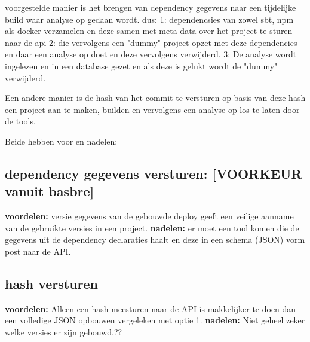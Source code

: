 voorgestelde manier is het brengen van dependency gegevens naar een tijdelijke build waar analyse op gedaan wordt. dus: 1: dependencsies van zowel sbt, npm als docker verzamelen en deze samen met meta data over het project te sturen naar de api  2: die vervolgens een "dummy" project opzet met deze dependencies en daar een analyse op doet en deze vervolgens verwijderd. 3: De analyse wordt ingelezen en in een database gezet en als deze is gelukt wordt de "dummy" verwijderd.

Een andere manier is de hash van het commit te versturen op basis van deze hash een project aan te maken, builden en vervolgens een analyse op los te laten door de tools.

Beide hebben voor en nadelen:

\subsection{dependency gegevens versturen: [VOORKEUR vanuit basbre]}\label{subsec:dependency-gegevens-versturen:-[voorkeur-vanuit-basbre]}
\textbf{voordelen:}
versie gegevens van de gebouwde deploy geeft een veilige aanname van de gebruikte versies in een project.
\textbf{nadelen:}
er moet een tool komen die de gegevens uit de dependency declaraties haalt en deze in een schema (JSON) vorm post naar de API\@.

\subsection{hash versturen}\label{subsec:hash-versturen}
\textbf{voordelen:}
Alleen een hash meesturen naar de API is makkelijker te doen dan een volledige JSON opbouwen vergeleken met optie 1.
\textbf{nadelen:}
Niet geheel zeker welke versies er zijn gebouwd.??
